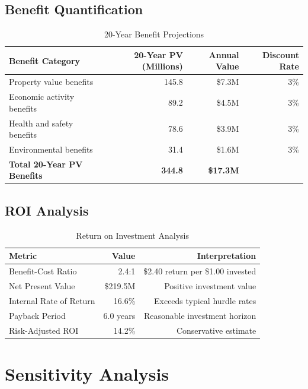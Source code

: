 \documentclass[11pt,letterpaper]{article}
\begin{document}
\subsection{Benefit Quantification}

\begin{table}[h]
\centering
\caption{20-Year Benefit Projections}
\begin{tabular}{lrrr}
\toprule
\textbf{Benefit Category} & \textbf{20-Year PV (Millions)} & \textbf{Annual Value} & \textbf{Discount Rate} \\
\midrule
Property value benefits & 145.8 & \$7.3M & 3\% \\
Economic activity benefits & 89.2 & \$4.5M & 3\% \\
Health and safety benefits & 78.6 & \$3.9M & 3\% \\
Environmental benefits & 31.4 & \$1.6M & 3\% \\
\textbf{Total 20-Year PV Benefits} & \textbf{344.8} & \textbf{\$17.3M} & \\
\bottomrule
\end{tabular}
\end{table}

\subsection{ROI Analysis}

\begin{table}[h]
\centering
\caption{Return on Investment Analysis}
\begin{tabular}{lrr}
\toprule
\textbf{Metric} & \textbf{Value} & \textbf{Interpretation} \\
\midrule
Benefit-Cost Ratio & 2.4:1 & \$2.40 return per \$1.00 invested \\
Net Present Value & \$219.5M & Positive investment value \\
Internal Rate of Return & 16.6\% & Exceeds typical hurdle rates \\
Payback Period & 6.0 years & Reasonable investment horizon \\
Risk-Adjusted ROI & 14.2\% & Conservative estimate \\
\bottomrule
\end{tabular}
\end{table}

\section{Sensitivity Analysis}
\end{document}
